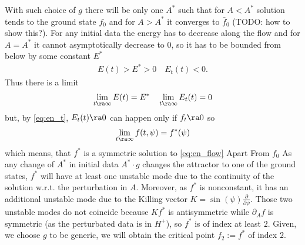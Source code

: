 With such choice of $g$ there will be only one $A^*$ such that for
$A<A^*$ solution tends to the ground state $f_0$ and for $A>A^*$ it
converges to $\bar{f}_0$ (TODO: how to show this?). For any initial
data the energy has to decrease along the flow and for $A=A^*$ it
cannot asymptotically decrease to $0$, so it has to be bounded from
below by some constant $E^*$
\begin{align}
  E(t)>E^*>0\quad E_t(t)<0.
\end{align}
Thus there is a limit
\begin{align}
  \lim_{t\ra\infty}E(t)=E^*\quad \lim_{t\ra\infty}E_t(t)=0
\end{align}
but, by \eqref{eq:en_t}, $E_t(t)\ra0$ can happen only if $f_t\ra0$ so
\begin{align}
  \lim_{t\ra\infty}f(t,\psi)=f^*(\psi)
\end{align}
which means, that $f^*$ is a symmetric solution to \eqref{eq:en_flow}
Apart From  $f_0$ As any change of $A^*$ in initial data $A^*\cdot g$
changes the attractor to one of the ground states, $f^*$ will have at
least one unstable mode due to the continuity of the solution
w.r.t. the perturbation in $A$. Moreover, as $f^*$ is nonconstant, it
has an additional unstable mode due to the Killing vector
$K=\sin(\psi)\frac{\partial}{\partial\psi}$. Those two unstable modes
do not coincide because $Kf^*$ is antisymmetric while $\partial_A f$
is symmetric (as the perturbated data is in $H^+$), so $f^*$ is of
index at least $2$. Given, we choose $g$ to be generic, we will obtain
the critical point $f_2:=f^*$ of index $2$.


